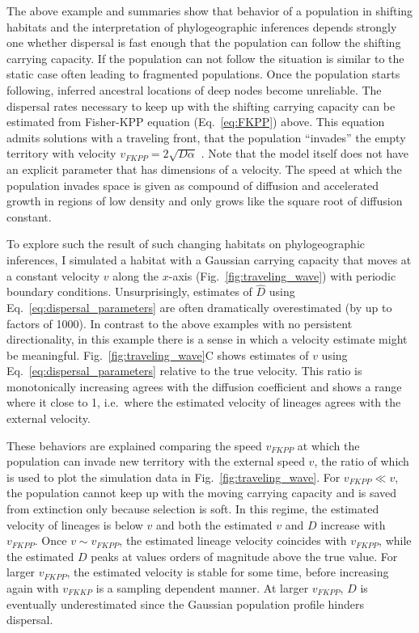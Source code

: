\documentclass[aps,rmp, twocolumn]{revtex4}
\begin{document}
The above example and summaries show that behavior of a population in shifting habitats and the interpretation of phylogeographic inferences depends strongly one whether dispersal is fast enough that the population can follow the shifting carrying capacity.
If the population can not follow the situation is similar to the static case often leading to fragmented populations.
Once the population starts following, inferred ancestral locations of deep nodes become unreliable.
The dispersal rates necessary to keep up with the shifting carrying capacity can be estimated from Fisher-KPP equation (Eq.~\ref{eq:FKPP}) above.
This equation admits solutions with a traveling front, that the population ``invades'' the empty territory with velocity $v_{FKPP} = 2\sqrt{D \alpha}$ \citep{fisher_wave_1937,KPP1937,hallatschek_life_2010}.
Note that the model itself does not have an explicit parameter that has dimensions of a velocity.
The speed at which the population invades space is given as compound of diffusion and accelerated growth in regions of low density and only grows like the square root of diffusion constant.

To explore such the result of such changing habitats on phylogeographic inferences, I simulated a habitat with a Gaussian carrying capacity that moves at a constant velocity $v$ along the $x$-axis (Fig.~\ref{fig:traveling_wave}) with periodic boundary conditions.
Unsurprisingly, estimates of $\hat{D}$ using Eq.~\ref{eq:dispersal_parameters} are often dramatically overestimated (by up to factors of 1000).
In contrast to the above examples with no persistent directionality, in this example there is a sense in which a velocity estimate might be meaningful.
Fig.~\ref{fig:traveling_wave}C shows estimates of $v$ using Eq.~\ref{eq:dispersal_parameters} relative to the true velocity.
This ratio is monotonically increasing agrees with the diffusion coefficient and shows a range where it close to 1, i.e.~where the estimated velocity of lineages agrees with the external velocity.

These behaviors are explained comparing the speed $v_{FKPP}$ at which the population can invade new territory with the external speed $v$, the ratio of which is used to plot the simulation data in Fig.~\ref{fig:traveling_wave}.
For $v_{FKPP} \ll v$, the population cannot keep up with the moving carrying capacity and is saved from extinction only because selection is soft.
In this regime, the estimated velocity of lineages is below $v$ and both the estimated $v$ and $D$ increase with $v_{FKPP}$.
Once $v\sim v_{FKPP}$, the estimated lineage velocity coincides with $v_{FKPP}$, while the estimated $D$ peaks at values orders of magnitude above the true value.
For larger $v_{FKPP}$, the estimated velocity is stable for some time, before increasing again with $v_{FKKP}$ is a sampling dependent manner.
At larger $v_{FKPP}$, $D$ is eventually underestimated since the Gaussian population profile hinders dispersal.
\end{document}
